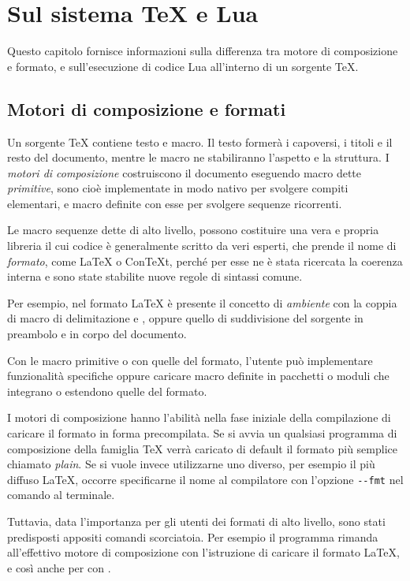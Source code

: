 

\chapter{Sul sistema \TeX{} e Lua}
\label{iichExplain}

Questo capitolo fornisce informazioni sulla differenza tra motore di
composizione e formato, e sull'esecuzione di codice Lua all'interno di un
sorgente \TeX.


\section{Motori di composizione e formati}

Un sorgente \TeX{} contiene testo e macro. Il testo formerà i capoversi, i
titoli e il resto del documento, mentre le macro ne stabiliranno l'aspetto e la
struttura. I \emph{motori di composizione} costruiscono il documento eseguendo
macro dette \emph{primitive}, sono cioè implementate in modo nativo per svolgere
compiti elementari, e macro definite con esse per svolgere sequenze ricorrenti.

Le macro sequenze dette di alto livello, possono costituire una vera e propria
libreria il cui codice è generalmente scritto da veri esperti, che prende il
nome di \emph{formato}, come \LaTeX{} o Con\TeX t, perché per esse ne è stata
ricercata la coerenza interna e sono state stabilite nuove regole di sintassi
comune.

Per esempio, nel formato \LaTeX{} è presente il concetto di \emph{ambiente} con
la coppia di macro di delimitazione  e , oppure quello
di suddivisione del sorgente in preambolo e in corpo del documento.

Con le macro primitive o con quelle del formato, l'utente può implementare
funzionalità specifiche oppure caricare macro definite in pacchetti o moduli che
integrano o estendono quelle del formato.

I motori di composizione hanno l'abilità nella fase iniziale della compilazione
di caricare il formato in forma precompilata. Se si avvia un qualsiasi programma
di composizione della famiglia \TeX{} verrà caricato di default il formato più
semplice chiamato \emph{plain}. Se si vuole invece utilizzarne uno diverso, per
esempio il più diffuso \LaTeX{}, occorre specificarne il nome al compilatore con
l'opzione \texttt{-{}-fmt} nel comando al terminale.

Tuttavia, data l'importanza per gli utenti dei formati di alto livello, sono
stati predisposti appositi comandi scorciatoia. Per esempio il programma
 rimanda all'effettivo motore di composizione  con
l'istruzione di caricare il formato \LaTeX{}, e così anche per 
con .

